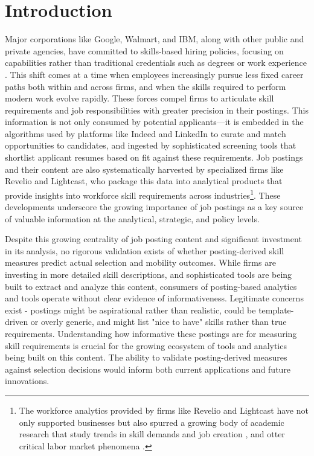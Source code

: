 \section{Introduction}


Major corporations like Google, Walmart, and IBM, along with other public and private agencies, have committed to 
skills-based hiring policies, focusing on capabilities rather than traditional credentials such as degrees or 
work experience \parencite{hbr2022skillsbased, mckinsey2020future, wef2020jobs}. This shift comes at a time when 
employees increasingly pursue less fixed career paths both within and across firms, and when the skills required to 
perform modern work evolve rapidly. These forces compel firms to articulate skill requirements and job responsibilities 
with greater precision in their postings. This information is not only consumed by potential applicants—it is embedded 
in the algorithms used by platforms like Indeed and LinkedIn to curate and match opportunities to candidates, and 
ingested by sophisticated screening tools that shortlist applicant resumes based on fit against these requirements. 
Job postings and their content are also systematically harvested by specialized firms like Revelio and Lightcast, 
who package this data into analytical products that provide insights into workforce skill requirements across 
industries\footnote{The workforce analytics provided by firms like Revelio and Lightcast have not only supported 
businesses but also spurred a growing body of academic research that study trends in skill demands and 
job creation \parencite{goldfarb2020artificial, azar2020concentration}, and otter critical labor market 
phenomena \parencite{hershbein2018recessions, forsythe2020labor, braxton2023technological}.}. These 
developments underscore the growing importance of job postings as a key source of valuable information 
at the analytical, strategic, and policy levels.


Despite this growing centrality of job posting content and significant investment in its analysis, no rigorous 
validation exists of whether posting-derived skill measures predict actual selection and mobility outcomes. While 
firms are investing in more detailed skill descriptions, and sophisticated tools are being built to extract and analyze 
this content, consumers of posting-based analytics and tools operate without clear evidence of informativeness. 
Legitimate concerns exist - postings might be aspirational rather than realistic, could be template-driven or overly generic, 
and might list "nice to have" skills rather than true requirements. Understanding how informative these postings are for 
measuring skill requirements is crucial for the growing ecosystem of tools and analytics being built on this content. 
The ability to validate posting-derived measures against selection decisions would inform both current applications and 
future innovations.


